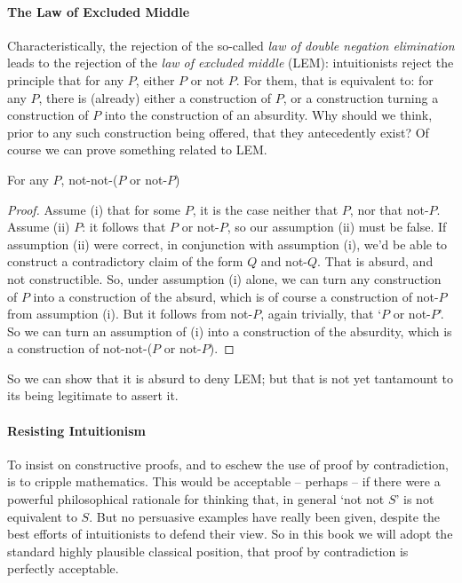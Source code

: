 \paragraph{The Law of Excluded Middle} Characteristically, the rejection of the so-called \emph{law of double negation elimination} leads to the rejection of the \emph{law of excluded middle} (LEM): intuitionists reject the principle that for any $P$, either $P$ or not $P$. For them, that is equivalent to: for any $P$, there is (already) either a construction of $P$, or a construction turning a construction of $P$ into the construction of an absurdity. Why should we think, prior to any such construction being offered, that they antecedently exist?
Of course we can prove something related to LEM. \begin{theorem}
  For any $P$, not-not-($P$ or not-$P$)
 \begin{proof}
  Assume (i) that for some $P$, it is the case neither that $P$, nor that not-$P$. Assume (ii) $P$: it follows that $P$ or not-$P$, so our assumption (ii) must be false. If assumption (ii) were correct, in conjunction with assumption (i), we'd be able to construct a contradictory claim of the form $Q$ and not-$Q$. That is absurd, and not constructible. So, under assumption (i) alone, we can turn any construction of $P$ into a construction of the absurd, which is of course a construction of not-$P$ from assumption (i). But it follows from not-$P$, again trivially, that `$P$ or not-$P$'. So we can turn an assumption of (i) into a construction of the absurdity, which is a construction of not-not-($P$ or not-$P$).
\end{proof}
\end{theorem}
So we can show that it is absurd to deny LEM; but that is not yet tantamount to its being legitimate to assert it.


\paragraph{Resisting Intuitionism} To insist on constructive proofs, and to eschew the use of proof by contradiction, is to cripple mathematics. This would be acceptable – perhaps – if there were a powerful philosophical rationale for thinking that, in general `not not $S$' is not equivalent to $S$. But no persuasive examples have really been given, despite the best efforts of intuitionists to defend their view. So in this book we will adopt the standard highly plausible classical position, that proof by contradiction is perfectly acceptable.



